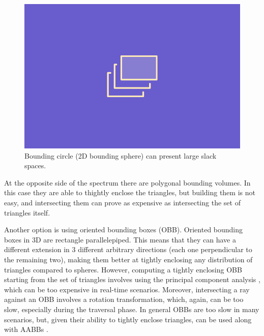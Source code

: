 \documentclass{PoliMi_MasterThesis}
\begin{document}
\begin{figure}[H]
    \centering
    \includegraphics[width=\textwidth*\real{0.4}]{Images/TODO.png}
    \caption{Bounding circle (2D bounding sphere) can present large slack spaces.}
    \label{fig:bounding_sphere}
\end{figure}

At the opposite side of the spectrum there are polygonal bounding volumes. In this case they are able to thightly enclose the triangles, but building them is not easy, and intersecting them can prove as expensive as intersecting the set of triangles itself.

Another option is using oriented bounding boxes (OBB). Oriented bounding boxes in 3D are rectangle parallelepiped. This means that they can have a different extension in 3 different arbitrary directions (each one perpendicular to the remaining two), making them better at tightly enclosing any distribution of triangles compared to spheres. However, computing a tightly enclosing OBB starting from the set of triangles involves using the principal component analysis \cite{obb_construction}, which can be too expensive in real-time scenarios. Moreover, intersecting a ray against an OBB involves a rotation transformation, which, again, can be too slow, especially during the traversal phase. In general OBBs are too slow in many scenarios, but, given their ability to tightly enclose triangles, can be used along with AABBs \cite{obbs_for_bvhs}.
\end{document}
